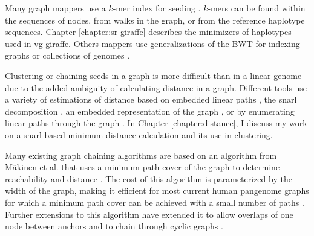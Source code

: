 \documentclass[11pt]{ucscthesis}
\begin{document}
Many graph mappers use a $k$-mer index for seeding \cite{rautiainen_graphaligner_2020,rakocevic_fast_2019,vaddadi_vmap_2019,schneeberger_simultaneous_2009}.
$k$-mers can be found within the sequences of nodes, from walks in the graph, or from the reference haplotype sequences. 
Chapter \ref{chapter:sr-giraffe} describes the minimizers of haplotypes used in vg giraffe.
Others mappers use generalizations of the BWT for indexing graphs \cite{garrison_vg_2018,kim_hisat2_2019,siren_indexing_2014,siren_indexes_2020} or collections of genomes \cite{rossi_moni_2022}.

Clustering or chaining seeds in a graph is more difficult than in a linear genome due to the added ambiguity of calculating distance in a graph.
Different tools use a variety of estimations of distance based on embedded linear paths \cite{garrison_vg_2018}, the snarl decomposition \cite{rautiainen_graphaligner_2020}, an embedded representation of the graph \cite{vaddadi_vmap_2019}, or by enumerating linear paths through the graph \cite{li_minigraph_2020}.
In Chapter \ref{chapter:distance}, I discuss my work on a snarl-based minimum distance calculation and its use in clustering. 

Many existing graph chaining algorithms are based on an algorithm from M{\"a}kinen et al. that uses a minimum path cover of the graph to determine reachability and distance \cite{makinen_dag_chaining_2019}.
The cost of this algorithm is parameterized by the width of the graph, making it efficient for most current human pangenome graphs for which a minimum path cover can be achieved with a small number of paths \cite{makinen_dag_chaining_2019}.
Further extensions to this algorithm have extended it to allow overlaps of one node between anchors \cite{ma_graphchainer_2023} and to chain through cyclic graphs \cite{panaligner_2024}.

\end{document}
